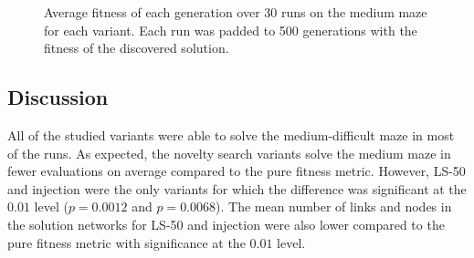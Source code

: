 \begin{figure}[H]
    \begin{center}
        
    \end{center}
    \caption{Average fitness of each generation over 30 runs on the medium maze for each variant.
             Each run was padded to 500 generations with the fitness of the discovered solution.}
\end{figure}

\newpage
\subsection{Discussion}
All of the studied variants were able to solve the medium-difficult maze in most of the runs.
As expected, the novelty search variants solve the medium maze in fewer evaluations on average
compared to the pure fitness metric. However, LS-50 and injection were the only variants for which
the difference was significant at the $0.01$ level ($p=0.0012$ and $p=0.0068$). The mean number of
links and nodes in the solution networks for LS-50 and injection were also lower
compared to the pure fitness metric with significance at the $0.01$ level.